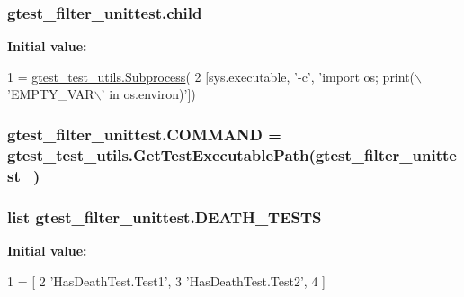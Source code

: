 \subsubsection[{\texorpdfstring{child}{child}}]{\setlength{\rightskip}{0pt plus 5cm}gtest\+\_\+filter\+\_\+unittest.\+child}\hypertarget{namespacegtest__filter__unittest_a1bb380432b61dc7972355aeb5c457c03}{}\label{namespacegtest__filter__unittest_a1bb380432b61dc7972355aeb5c457c03}
{\bfseries Initial value\+:}
\begin{DoxyCode}
1 = \hyperlink{classgtest__test__utils_1_1_subprocess}{gtest\_test\_utils.Subprocess}(
2     [sys.executable, \textcolor{stringliteral}{'-c'}, \textcolor{stringliteral}{'import os; print(\(\backslash\)'EMPTY\_VAR\(\backslash\)' in os.environ)'}])
\end{DoxyCode}
\subsubsection[{\texorpdfstring{C\+O\+M\+M\+A\+ND}{COMMAND}}]{\setlength{\rightskip}{0pt plus 5cm}gtest\+\_\+filter\+\_\+unittest.\+C\+O\+M\+M\+A\+ND = {\bf gtest\+\_\+test\+\_\+utils.\+Get\+Test\+Executable\+Path}(\textquotesingle{}gtest\+\_\+filter\+\_\+unittest\+\_\+\textquotesingle{})}\hypertarget{namespacegtest__filter__unittest_aaf600b005b9c09e727b55b60fdf8f507}{}\label{namespacegtest__filter__unittest_aaf600b005b9c09e727b55b60fdf8f507}
\subsubsection[{\texorpdfstring{D\+E\+A\+T\+H\+\_\+\+T\+E\+S\+TS}{DEATH_TESTS}}]{\setlength{\rightskip}{0pt plus 5cm}list gtest\+\_\+filter\+\_\+unittest.\+D\+E\+A\+T\+H\+\_\+\+T\+E\+S\+TS}\hypertarget{namespacegtest__filter__unittest_ab14d082dc05c07458595606a64616d0b}{}\label{namespacegtest__filter__unittest_ab14d082dc05c07458595606a64616d0b}
{\bfseries Initial value\+:}
\begin{DoxyCode}
1 = [
2     \textcolor{stringliteral}{'HasDeathTest.Test1'},
3     \textcolor{stringliteral}{'HasDeathTest.Test2'},
4     ]
\end{DoxyCode}
